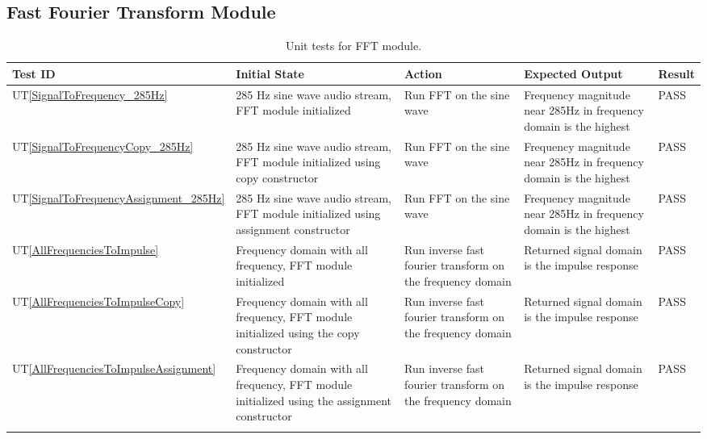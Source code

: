 \documentclass[12pt, titlepage]{article}
\newcommand{\utref}[1]{UT\ref{#1}}
\begin{document}
\subsection{Fast Fourier Transform Module}
{\footnotesize
\begin{longtable}{|p{0.8cm}|p{3.5cm}|p{3.5cm}|p{3.5cm}|p{1cm}|}
    \hline
    \textbf{Test ID} & \textbf{Initial State} & \textbf{Action} &
    \textbf{Expected Output} & \textbf{Result} \\ 
    \endfirsthead
    \hline

    \utref{SignalToFrequency_285Hz} & 285 Hz sine wave audio stream, FFT module
    initialized & Run FFT on the sine wave  & Frequency magnitude near 285Hz in
    frequency domain is the highest & PASS\\
    \hline
    \utref{SignalToFrequencyCopy_285Hz} & 285 Hz sine wave audio stream, FFT
    module initialized using copy constructor & Run FFT on the sine wave  &
    Frequency magnitude near 285Hz in frequency domain is the highest & PASS\\
    \hline
    \utref{SignalToFrequencyAssignment_285Hz} & 285 Hz sine wave audio stream,
    FFT module initialized using assignment constructor & Run FFT on the sine
    wave  & Frequency magnitude near 285Hz in frequency domain is the highest &
    PASS\\
    \hline
    \utref{AllFrequenciesToImpulse} & Frequency domain with all frequency, FFT
    module initialized& Run inverse fast fourier transform on the frequency
    domain  & Returned signal domain is the impulse response & PASS\\
    \hline
    \utref{AllFrequenciesToImpulseCopy} & Frequency domain with all frequency,
    FFT module initialized using the copy constructor & Run inverse fast fourier
    transform on the frequency domain  & Returned signal domain is the impulse
    response & PASS\\
    \hline
    \utref{AllFrequenciesToImpulseAssignment} & Frequency domain with all
    frequency, FFT module initialized using the assignment constructor & Run
    inverse fast fourier transform on the frequency domain  & Returned signal
    domain is the impulse response & PASS\\
    \hline
    \caption{Unit tests for FFT module.}
    \label{tab:unit_test_fft}
\end{longtable}
}

\end{document}
